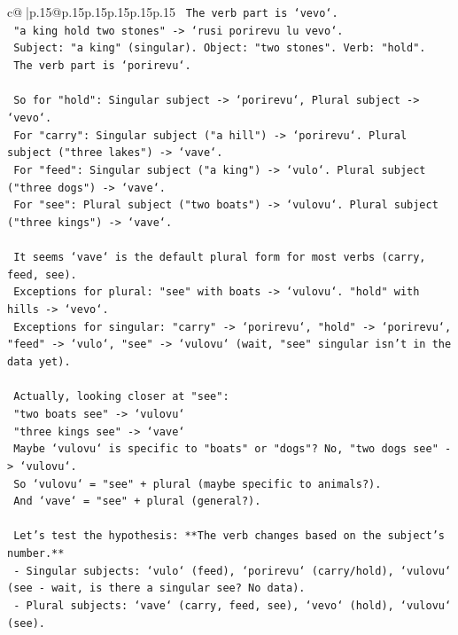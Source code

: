 \documentclass{article}
\begin{document}
{\begin{supertabular}{c@{$\;$}|p{.15\linewidth}@{}p{.15\linewidth}p{.15\linewidth}p{.15\linewidth}p{.15\linewidth}p{.15\linewidth}}
{{{\texttt{   The verb part is `vevo`.} \\
\texttt{   "a king hold two stones" {-}> `rusi porirevu lu vevo`.} \\
\texttt{   Subject: "a king" (singular). Object: "two stones". Verb: "hold".} \\
\texttt{   The verb part is `porirevu`.} \\
\\ 
\texttt{   So for "hold": Singular subject {-}> `porirevu`, Plural subject {-}> `vevo`.} \\
\texttt{   For "carry": Singular subject ("a hill") {-}> `porirevu`. Plural subject ("three lakes") {-}> `vave`.} \\
\texttt{   For "feed": Singular subject ("a king") {-}> `vulo`. Plural subject ("three dogs") {-}> `vave`.} \\
\texttt{   For "see": Plural subject ("two boats") {-}> `vulovu`. Plural subject ("three kings") {-}> `vave`.} \\
\\ 
\texttt{   It seems `vave` is the default plural form for most verbs (carry, feed, see).} \\
\texttt{   Exceptions for plural: "see" with boats {-}> `vulovu`. "hold" with hills {-}> `vevo`.} \\
\texttt{   Exceptions for singular: "carry" {-}> `porirevu`, "hold" {-}> `porirevu`, "feed" {-}> `vulo`, "see" {-}> `vulovu` (wait, "see" singular isn't in the data yet).} \\
\\ 
\texttt{   Actually, looking closer at "see":} \\
\texttt{   "two boats see" {-}> `vulovu`} \\
\texttt{   "three kings see" {-}> `vave`} \\
\texttt{   Maybe `vulovu` is specific to "boats" or "dogs"? No, "two dogs see" {-}> `vulovu`.} \\
\texttt{   So `vulovu` = "see" + plural (maybe specific to animals?).} \\
\texttt{   And `vave` = "see" + plural (general?).} \\
\\ 
\texttt{   Let's test the hypothesis: **The verb changes based on the subject's number.**} \\
\texttt{   {-} Singular subjects: `vulo` (feed), `porirevu` (carry/hold), `vulovu` (see {-} wait, is there a singular see? No data).} \\
\texttt{   {-} Plural subjects: `vave` (carry, feed, see), `vevo` (hold), `vulovu` (see).} \\
}}}
\end{supertabular}}
\end{document}
